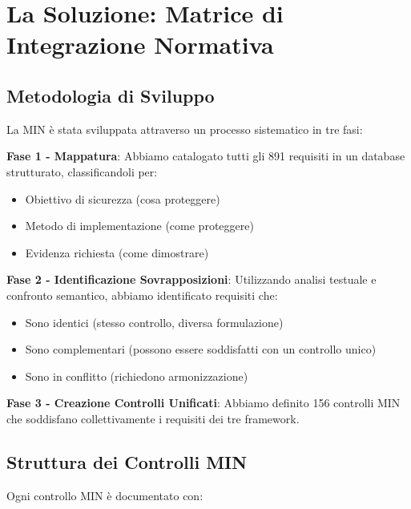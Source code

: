 \section{La Soluzione: Matrice di Integrazione Normativa}

\subsection{Metodologia di Sviluppo}

La MIN è stata sviluppata attraverso un processo sistematico in tre fasi:

\textbf{Fase 1 - Mappatura}: Abbiamo catalogato tutti gli 891 requisiti in un database strutturato, classificandoli per:
\begin{itemize}
\item Obiettivo di sicurezza (cosa proteggere)
\item Metodo di implementazione (come proteggere)
\item Evidenza richiesta (come dimostrare)
\end{itemize}

\textbf{Fase 2 - Identificazione Sovrapposizioni}: Utilizzando analisi testuale e confronto semantico, abbiamo identificato requisiti che:
\begin{itemize}
\item Sono identici (stesso controllo, diversa formulazione)
\item Sono complementari (possono essere soddisfatti con un controllo unico)
\item Sono in conflitto (richiedono armonizzazione)
\end{itemize}

\textbf{Fase 3 - Creazione Controlli Unificati}: Abbiamo definito 156 controlli MIN che soddisfano collettivamente i requisiti dei tre framework.

\subsection{Struttura dei Controlli MIN}

Ogni controllo MIN è documentato con:

